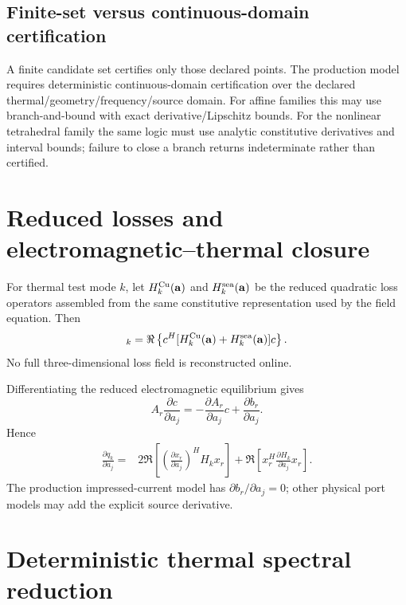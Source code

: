 \documentclass[11pt]{article}
\theoremstyle{remark}
\newcommand{\aT}{\mathbf a}
\begin{document}
\subsection{Finite-set versus continuous-domain certification}
A finite candidate set certifies only those declared points. The production model requires deterministic continuous-domain certification over the declared thermal/geometry/frequency/source domain. For affine families this may use branch-and-bound with exact derivative/Lipschitz bounds. For the nonlinear tetrahedral family the same logic must use analytic constitutive derivatives and interval bounds; failure to close a branch returns indeterminate rather than certified.

\section{Reduced losses and electromagnetic--thermal closure}

For thermal test mode \(k\), let \(H_k^{\rm Cu}(\aT)\) and \(H_k^{\rm sea}(\aT)\) be the reduced quadratic loss operators assembled from the same constitutive representation used by the field equation. Then
\begin{equation}
[q_{\rm em,r}]_k
=\Re\left\{c^H[H_k^{\rm Cu}(\aT)+H_k^{\rm sea}(\aT)]c\right\}.
\label{eq:reduced_heat_source}
\end{equation}
No full three-dimensional loss field is reconstructed online.

Differentiating the reduced electromagnetic equilibrium gives
\[
A_r\frac{\partial c}{\partial a_j}
=-\frac{\partial A_r}{\partial a_j}c
+\frac{\partial b_r}{\partial a_j}.
\]
Hence
\begin{align}
\frac{\partial q_k}{\partial a_j}
={}&2\Re\left[\left(\frac{\partial x_r}{\partial a_j}\right)^HH_kx_r\right]
+\Re\left[x_r^H\frac{\partial H_k}{\partial a_j}x_r\right].
\label{eq:heat_jacobian}
\end{align}
The production impressed-current model has \(\partial b_r/\partial a_j=0\); other physical port models may add the explicit source derivative.

\section{Deterministic thermal spectral reduction}
\end{document}
